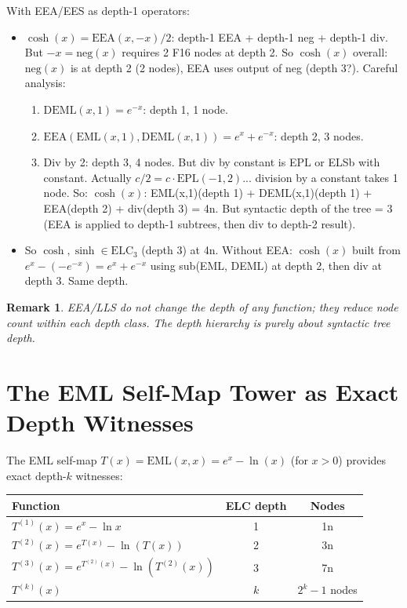 \documentclass[11pt]{article}
\newtheorem{remark}[theorem]{Remark}
\begin{document}
With EEA/EES as depth-1 operators:
\begin{itemize}
  \item $\cosh(x) = \mathrm{EEA}(x,-x)/2$: depth-1 EEA + depth-1 neg + depth-1 div. But
        $-x = \mathrm{neg}(x)$ requires 2 F16 nodes at depth 2. So
        $\cosh(x)$ overall: $\mathrm{neg}(x)$ is at depth 2 (2 nodes), EEA uses output of neg
        (depth 3?). Careful analysis:
        \begin{enumerate}
          \item $\mathrm{DEML}(x, 1) = e^{-x}$: depth 1, 1 node.
          \item $\mathrm{EEA}(\mathrm{EML}(x,1), \mathrm{DEML}(x,1)) = e^x + e^{-x}$: depth 2, 3 nodes.
          \item Div by 2: depth 3, 4 nodes. But div by constant is EPL or ELSb with constant.
          Actually $c/2 = c \cdot \mathrm{EPL}(-1, 2)$... division by a constant takes 1 node.
          So: $\cosh(x)$: EML(x,1)(depth 1) + DEML(x,1)(depth 1) + EEA(depth 2) + div(depth 3) = 4n.
          But syntactic depth of the tree = 3 (EEA is applied to depth-1 subtrees, then div to depth-2 result).
        \end{enumerate}
  \item So $\cosh, \sinh \in \mathrm{ELC}_3$ (depth 3) at 4n.
        Without EEA: $\cosh(x)$ built from $e^x - (-e^{-x}) = e^x + e^{-x}$ using
        sub(EML, DEML) at depth 2, then div at depth 3. Same depth.
\end{itemize}

\begin{remark}
EEA/LLS do not change the \emph{depth} of any function; they reduce \emph{node count}
within each depth class. The depth hierarchy is purely about syntactic tree depth.
\end{remark}

\section{The EML Self-Map Tower as Exact Depth Witnesses}
\label{sec:tower}

The EML self-map $T(x) = \mathrm{EML}(x,x) = e^x - \ln(x)$ (for $x > 0$)
provides exact depth-$k$ witnesses:

\begin{center}
\begin{tabular}{lcc}
\toprule
Function & ELC depth & Nodes \\
\midrule
$T^{(1)}(x) = e^x - \ln x$              & 1 & 1n \\
$T^{(2)}(x) = e^{T(x)} - \ln(T(x))$    & 2 & 3n \\
$T^{(3)}(x) = e^{T^{(2)}(x)} - \ln(T^{(2)}(x))$ & 3 & 7n \\
$T^{(k)}(x)$ & $k$ & $2^k - 1$ nodes \\
\bottomrule
\end{tabular}
\end{center}
\end{document}
